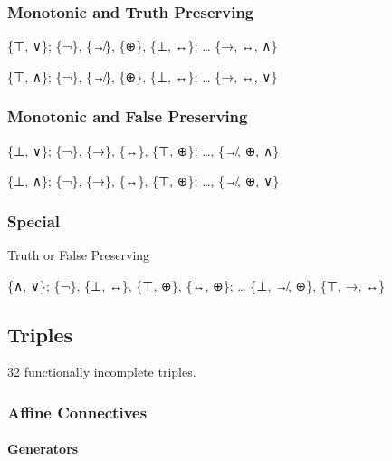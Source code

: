 \hypertarget{monotonic-and-truth-preserving}{%
\subsubsection{Monotonic and Truth
Preserving}\label{monotonic-and-truth-preserving}}

\{⊤, ∨\}; \{¬\}, \{↛\}, \{⊕\}, \{⊥, ↔\}; \ldots{} \{→, ↔, ∧\}

\{⊤, ∧\}; \{¬\}, \{↛\}, \{⊕\}, \{⊥, ↔\}; \ldots{} \{→, ↔, ∨\}

\hypertarget{monotonic-and-false-preserving}{%
\subsubsection{Monotonic and False
Preserving}\label{monotonic-and-false-preserving}}

\{⊥, ∨\}; \{¬\}, \{→\}, \{↔\}, \{⊤, ⊕\}; \ldots, \{↛, ⊕, ∧\}

\{⊥, ∧\}; \{¬\}, \{→\}, \{↔\}, \{⊤, ⊕\}; \ldots, \{↛, ⊕, ∨\}

\hypertarget{section}{%
\subsubsection{}\label{section}}

\hypertarget{special}{%
\subsubsection{Special}\label{special}}

Truth or False Preserving

\{∧, ∨\}; \{¬\}, \{⊥, ↔\}, \{⊤, ⊕\}, \{↔, ⊕\}; \ldots{} \{⊥, ↛, ⊕\},
\{⊤, →, ↔\}

\hypertarget{triples-1}{%
\subsection{Triples}\label{triples-1}}

32 functionally incomplete triples.

\hypertarget{affine-connectives}{%
\subsubsection{Affine Connectives}\label{affine-connectives}}

\hypertarget{generators-1}{%
\paragraph{Generators}\label{generators-1}}

